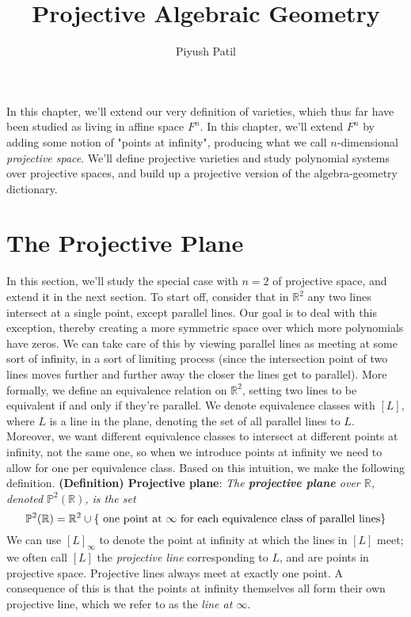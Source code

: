 \documentclass{article}
\newcommand*{\tb}{\textbf}
\newcommand*{\ti}{\textit}
\newcommand*{\nn}{\newline \newline}
\begin{document}
\title{Projective Algebraic Geometry}
\author{Piyush Patil}
\maketitle

In this chapter, we'll extend our very definition of varieties, which thus far have been studied as living in affine space $ F^n $. In this chapter, we'll extend $ F^n $ by adding some notion of "points at infinity", producing what we call $ n $-dimensional \textit{projective space}. We'll define projective varieties and study polynomial systems over projective spaces, and build up a projective version of the algebra-geometry dictionary.

\section{The Projective Plane}
In this section, we'll study the special case with $ n = 2 $ of projective space, and extend it in the next section. To start off, consider that in $ \mathbb{R}^2 $ any two lines intersect at a single point, except parallel lines. Our goal is to deal with this exception, thereby creating a more symmetric space over which more polynomials have zeros. We can take care of this by viewing parallel lines as meeting at some sort of infinity, in a sort of limiting process (since the intersection point of two lines moves further and further away the closer the lines get to parallel). More formally, we define an equivalence relation on $ \mathbb{R}^2 $, setting two lines to be equivalent if and only if they're parallel. We denote equivalence classes with $ [ L ] $, where $ L $ is a line in the plane, denoting the set of all parallel lines to $ L $. Moreover, we want different equivalence classes to intersect at different points at infinity, not the same one, so when we introduce points at infinity we need to allow for one per equivalence class. Based on this intuition, we make the following definition.
\nn
\tb{(Definition) Projective plane}: \ti{The \tb{projective plane} over $ \mathbb{R} $, denoted $ \mathbb{P}^2(\mathbb{R}) $, is the set}
$$ \mathbb{P}^2(\mathbb{R}) = \mathbb{R}^2 \cup \{ \text{ one point at $ \infty $ for each equivalence class of parallel lines} \} $$
We can use $ [ L ]_\infty $ to denote the point at infinity at which the lines in $ [ L ] $ meet; we often call $ [ L ] $ the \ti{projective line} corresponding to $ L $, and are points in projective space. Projective lines always meet at exactly one point. A consequence of this is that the points at infinity themselves all form their own projective line, which we refer to as the \ti{line at $ \infty $}.
\end{document}
